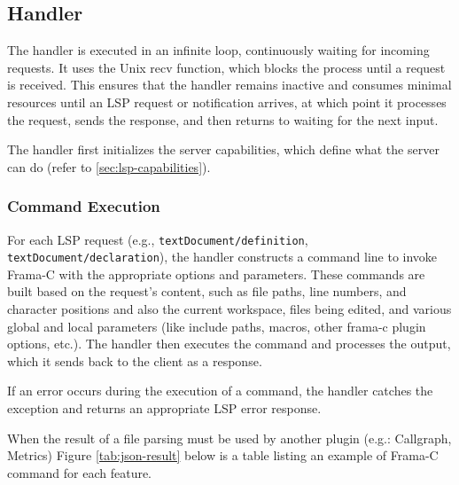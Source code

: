 \documentclass[10pt]{article}
\begin{document}
\begin{singlespace}
\subsection{Handler}
The handler is executed in an infinite loop, continuously waiting for incoming requests. It uses the Unix recv function, which blocks the process until a request is received. This ensures that the handler remains inactive and consumes minimal resources until an LSP request or notification arrives, at which point it processes the request, sends the response, and then returns to waiting for the next input.

The handler first initializes the server capabilities, which define what the server can do (refer to \ref{sec:lsp-capabilities}).

\subsubsection{Command Execution}

For each LSP request (e.g., \texttt{textDocument/definition}, \texttt{textDocument/declaration}), the handler constructs a command line to invoke Frama-C with the appropriate options and parameters. These commands are built based on the request's content, such as file paths, line numbers, and character positions and also the current workspace, files being edited, and various global and local parameters (like include paths, macros, other frama-c plugin options, etc.). The handler then executes the command and processes the output, which it sends back to the client as a response.

If an error occurs during the execution of a command, the handler catches the exception and returns an appropriate LSP error response.

When the result of a file parsing must be used by another plugin (e.g.: Callgraph, Metrics)
Figure \ref{tab:json-result} below is a table listing an example of Frama-C command for each feature.


\end{singlespace}
\end{document}
